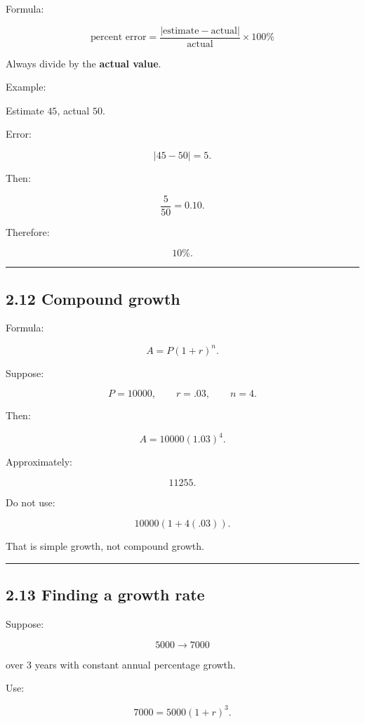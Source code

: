 \documentclass[
]{article}
\begin{document}
Formula:

\[
\boxed{
\text{percent error}
=
\frac{|\text{estimate}-\text{actual}|}
{\text{actual}}\times100\%
}
\]

Always divide by the \textbf{actual value}.

Example:

Estimate \(45\), actual \(50\).

Error:

\[
|45-50|=5.
\]

Then:

\[
\frac5{50}=0.10.
\]

Therefore:

\[
\boxed{10\%}.
\]

\begin{center}\rule{0.5\linewidth}{0.5pt}\end{center}

\subsection{2.12 Compound growth}\label{compound-growth}

Formula:

\[
\boxed{A=P(1+r)^n}.
\]

Suppose:

\[
P=10000,\qquad r=.03,\qquad n=4.
\]

Then:

\[
A=10000(1.03)^4.
\]

Approximately:

\[
\boxed{11255}.
\]

Do not use:

\[
10000(1+4(.03)).
\]

That is simple growth, not compound growth.

\begin{center}\rule{0.5\linewidth}{0.5pt}\end{center}

\subsection{2.13 Finding a growth rate}\label{finding-a-growth-rate}

Suppose:

\[
5000\rightarrow7000
\]

over 3 years with constant annual percentage growth.

Use:

\[
7000=5000(1+r)^3.
\]
\end{document}
